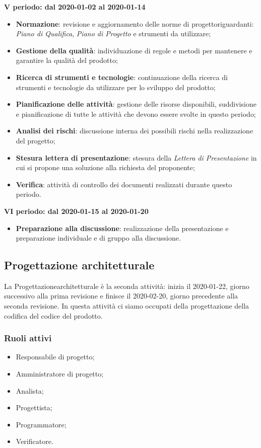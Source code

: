 \textbf{V periodo: dal 2020-01-02 al 2020-01-14}
\begin{itemize}
	\item \textbf{Normazione}: revisione e aggiornamento delle norme di progetto\glosp riguardanti: \textit{Piano di Qualifica}, \textit{Piano di Progetto} e strumenti da utilizzare;
	\item \textbf{Gestione della qualità}: individuazione di regole e metodi per mantenere e garantire la qualità del prodotto\glo;
	\item \textbf{Ricerca di strumenti e tecnologie}: continuazione della ricerca di strumenti e tecnologie da utilizzare per lo sviluppo del prodotto\glo;
	\item \textbf{Pianificazione delle attività}: gestione delle risorse disponibili, suddivisione e pianificazione di tutte le attività che devono essere svolte in questo periodo;
	\item \textbf{Analisi dei rischi}: discussione interna dei possibili rischi nella realizzazione del progetto\glo;
	\item \textbf{Stesura lettera di presentazione}: stesura della \textit{Lettera di Presentazione} in cui si propone una soluzione alla richiesta del proponente;
	\item \textbf{Verifica}: attività di controllo dei documenti realizzati durante questo periodo.
\end{itemize}

\textbf{VI periodo: dal 2020-01-15 al 2020-01-20}
\begin{itemize}
	\item \textbf{Preparazione alla discussione}: realizzazione della presentazione e preparazione individuale e di gruppo alla discussione.
\end{itemize}

\subsection{Progettazione architetturale}
La Progettazione\glosp architetturale è la seconda attività: inizia il 2020-01-22, giorno successivo alla prima revisione e finisce il 2020-02-20, giorno precedente alla seconda revisione. In questa attività ci siamo occupati della progettazione della codifica del codice del prodotto\glo.

\subsubsection{Ruoli attivi}
\begin{itemize}
	\item Responsabile di progetto\glo;
	\item Amministratore di progetto\glo;
	\item Analista;
	\item Progettista;
	\item Programmatore;
	\item Verificatore.
\end{itemize}

